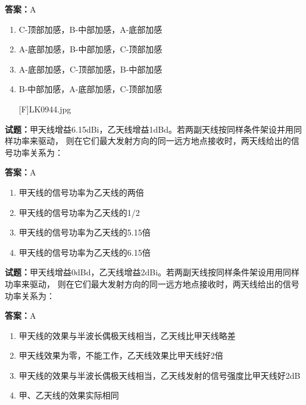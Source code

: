 \documentclass{ctexbook}
\begin{document}
\textbf{答案：}A 

\begin{enumerate}[leftmargin=3em]
  \item C-顶部加感，B-中部加感，A-底部加感 

  \item A-底部加感，B-中部加感，C-顶部加感 

  \item A-底部加感，C-顶部加感，B-中部加感 

  \item B-中部加感，A-底部加感，C-顶部加感 

[F]LK0944.jpg 

\end{enumerate}





\vspace{1em}

\textbf{试题：}甲天线增益6.15dBi，乙天线增益1dBd。若两副天线按同样条件架设并用同样功率来驱动，
则在它们最大发射方向的同一远方地点接收时，两天线给出的信号功率关系为： 

\textbf{答案：}A 

\begin{enumerate}[leftmargin=3em]
  \item 甲天线的信号功率为乙天线的两倍 

  \item 甲天线的信号功率为乙天线的1/2 

  \item 甲天线的信号功率为乙天线的5.15倍 

  \item 甲天线的信号功率为乙天线的6.15倍 

\end{enumerate}





\vspace{1em}

\textbf{试题：}甲天线增益0dBd，乙天线增益2dBi。若两副天线按同样条件架设用用同样功率来驱动，
则在它们最大发射方向的同一远方地点接收时，两天线给出的信号功率关系为： 

\textbf{答案：}A 

\begin{enumerate}[leftmargin=3em]
  \item 甲天线的效果与半波长偶极天线相当，乙天线比甲天线略差 

  \item 甲天线效果为零，不能工作，乙天线效果比甲天线好2倍 

  \item 甲天线的效果与半波长偶极天线相当，乙天线发射的信号强度比甲天线好2dB 

  \item 甲、乙天线的效果实际相同 

\end{enumerate}
\end{document}
